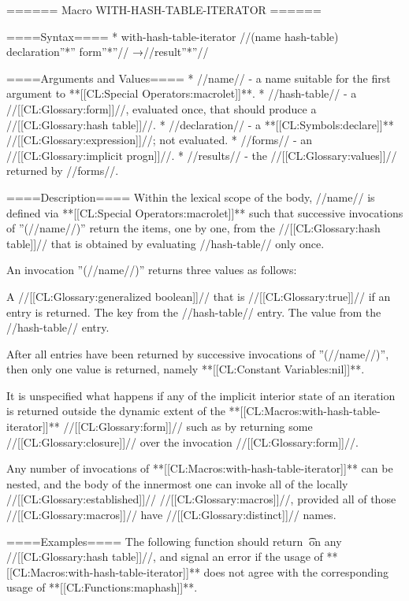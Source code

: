 ====== Macro WITH-HASH-TABLE-ITERATOR ======

====Syntax====
  * with-hash-table-iterator //(name hash-table) declaration''*'' form''*''// →//result''*''//

====Arguments and Values====
  * //name// - a name suitable for the first argument to **[[CL:Special Operators:macrolet]]**.
  * //hash-table// - a //[[CL:Glossary:form]]//, evaluated once, that should produce a //[[CL:Glossary:hash table]]//.
  * //declaration// - a **[[CL:Symbols:declare]]** //[[CL:Glossary:expression]]//; not evaluated.
  * //forms// - an //[[CL:Glossary:implicit progn]]//.
  * //results// - the //[[CL:Glossary:values]]// returned by //forms//.

====Description====
Within the lexical scope of the body, //name// is defined via **[[CL:Special Operators:macrolet]]** such that successive invocations of ''(//name//)'' return the items, one by one, from the //[[CL:Glossary:hash table]]// that is obtained by evaluating //hash-table// only once.

An invocation ''(//name//)'' returns three values as follows:

\beginlist

 A //[[CL:Glossary:generalized boolean]]// that is //[[CL:Glossary:true]]// if an entry is returned. 
 The key from the //hash-table// entry. 
 The value from the //hash-table// entry. 

\endlist After all entries have been returned by successive invocations of ''(//name//)'', then only one value is returned, namely **[[CL:Constant Variables:nil]]**.


It is unspecified what happens if any of the implicit interior state of an iteration is returned outside the dynamic extent of the **[[CL:Macros:with-hash-table-iterator]]** //[[CL:Glossary:form]]// such as by returning some //[[CL:Glossary:closure]]// over the invocation //[[CL:Glossary:form]]//.

Any number of invocations of **[[CL:Macros:with-hash-table-iterator]]** can be nested, and the body of the innermost one can invoke all of the locally //[[CL:Glossary:established]]// //[[CL:Glossary:macros]]//, provided all of those //[[CL:Glossary:macros]]// have //[[CL:Glossary:distinct]]// names.

====Examples====
The following function should return \t\ on any //[[CL:Glossary:hash table]]//, and signal an error if the usage of **[[CL:Macros:with-hash-table-iterator]]** does not agree with the corresponding usage of **[[CL:Functions:maphash]]**.

